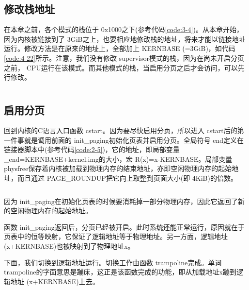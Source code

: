 \documentclass[main.tex]{subfiles}
\begin{document}
\begin{CJK*}{UTF8}{song}
\subsection{修改栈地址}
在本章之前，各个模式的栈位于 0x1000之下(参考代码\ref{code:3-4})。从本章开始，因为内核被链接到了 3\-GiB之上，也要相应地修改栈的地址，将来才能以链接地址运行。修改方法是在原来的地址上，全部加上 KERN\-BASE (=3\-GiB)，如代码\ref{code:4-22}所示。注意，我们没有修改 supervisor模式的栈，因为在尚未开启分页之前， CPU运行在该模式。而其他模式的栈，当启用分页之后才会访问，可以先行修改。

\begin{code}
\label{code:4-22}
\inputminted[firstline=127,lastline=144,linenos,numbersep=5pt,frame=lines,framesep=2mm]{gas}{src/chapter04/kernel/entry.S}
\end{code}

\subsection{启用分页}
回到内核的C语言入口函数 cstart。因为要尽快启用分页，所以进入 cstart后的第一件事就是调用前面的 init\_\-paging初始化页表并启用分页。全局符号 end定义在链接器脚本中(参考代码\ref{code:2-5})，它的地址，即局部变量 \_end=KERN\-BASE+kernel.img的大小，宏 R(x)=x-KERN\-BASE。局部变量 phys\-free保存着内核被加载到物理内存的结束地址，亦即空闲物理内存的起始地址，而且通过 PAGE\_\-ROUNDUP把它向上取整到页面大小(即 4\-KiB)的倍数。

\begin{code}
\label{code:4-23}
\inputminted[firstline=347,lastline=355,linenos,numbersep=5pt,frame=lines,framesep=2mm]{c}{src/chapter04/kernel/machdep.c}
\end{code}

因为 init\_\-paging在初始化页表的时候要消耗掉一部分物理内存，因此它返回了新的空闲物理内存的起始地址。

\par
函数 init\_\-paging返回后，分页已经被开启。此时系统还能正常运行，原因就在于页表中的恒等映射，它保证了逻辑地址等于物理地址。另一方面，逻辑地址 (x+KERN\-BASE)也被映射到了物理地址x。

\par
下面，我们切换到逻辑地址运行。切换工作由函数 trampoline完成。单词 trampoline的字面意思是蹦床，这正是该函数完成的功能，即从加载地址x蹦到逻辑地址 (x+KERN\-BASE)上去。

\begin{code}
\label{code:4-24}
\inputminted[firstline=357,lastline=360,linenos,numbersep=5pt,frame=lines,framesep=2mm]{c}{src/chapter04/kernel/machdep.c}
\end{code}


\end{CJK*}
\end{document}

